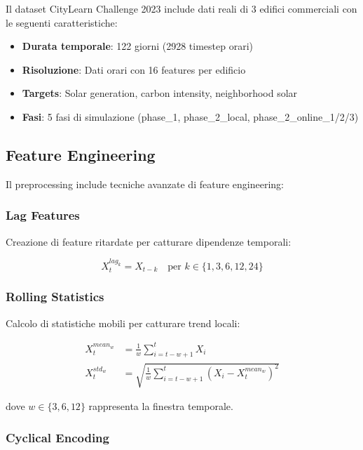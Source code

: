\documentclass[12pt,a4paper,twoside]{report}
\begin{document}
Il dataset CityLearn Challenge 2023 include dati reali di 3 edifici commerciali con le seguenti caratteristiche:

\begin{itemize}
    \item \textbf{Durata temporale}: 122 giorni (2928 timestep orari)
    \item \textbf{Risoluzione}: Dati orari con 16 features per edificio
    \item \textbf{Targets}: Solar generation, carbon intensity, neighborhood solar
    \item \textbf{Fasi}: 5 fasi di simulazione (phase\_1, phase\_2\_local, phase\_2\_online\_1/2/3)
\end{itemize}

\subsection{Feature Engineering}

Il preprocessing include tecniche avanzate di feature engineering:

\subsubsection{Lag Features}

Creazione di feature ritardate per catturare dipendenze temporali:

\begin{equation}
X_t^{lag_k} = X_{t-k} \quad \text{per } k \in \{1, 3, 6, 12, 24\}
\end{equation}

\subsubsection{Rolling Statistics}

Calcolo di statistiche mobili per catturare trend locali:

\begin{align}
X_t^{mean_w} &= \frac{1}{w} \sum_{i=t-w+1}^{t} X_i \\
X_t^{std_w} &= \sqrt{\frac{1}{w} \sum_{i=t-w+1}^{t} (X_i - X_t^{mean_w})^2}
\end{align}

dove $w \in \{3, 6, 12\}$ rappresenta la finestra temporale.

\subsubsection{Cyclical Encoding}
\end{document}
